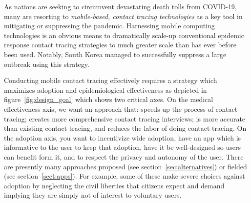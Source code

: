 \documentclass{article}
\begin{document}

As nations are seeking to circumvent devastating death tolls from COVID-19, many are resorting to \emph{mobile-based, contact tracing technologies} as a key tool in mitigating or suppressing the pandemic. Harnessing mobile computing technologies is an obvious means to dramatically scale-up conventional epidemic response contact tracing strategies to much greater scale than has ever before been used.  Notably, South Korea managed to successfully suppress a large outbreak using this strategy.  

\iffalse
Conducting mobile contact tracing effectively requires a strategy which maximizes adoption and epidemiological effectiveness as depicted in figure~\ref{fig:design_goal} which shows two critical axes.   On the medical effectiveness axis, we want an approach that: speeds up the process of contact tracing; creates more comprehensive contact tracing interviews; is more accurate than existing contact tracing, and reduces the labor of doing contact tracing.  On the adoption axis, you want to incentivize wide adoption, have an app which is informative to the user to keep that adoption, have it be well-designed so users can benefit form it, and to respect the privacy and autonomy of the user.  There are presently many approaches proposed (see section~\ref{sec:alternatives}) or fielded (see section~\ref{sect:apps}).  For example, some of these make severe choices against adoption by neglecting the civil liberties that citizens expect and demand implying they are simply not of interest to voluntary users.  
\end{document}

